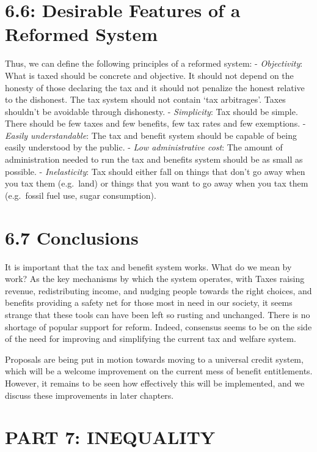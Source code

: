 \documentclass[]{tufte-handout}
\begin{document}
\hypertarget{desirable-features-of-a-reformed-system}{%
\section{6.6: Desirable Features of a Reformed
System}\label{desirable-features-of-a-reformed-system}}

Thus, we can define the following principles of a reformed system: -
\emph{Objectivity}: What is taxed should be concrete and objective. It
should not depend on the honesty of those declaring the tax and it
should not penalize the honest relative to the dishonest. The tax system
should not contain `tax arbitrages'. Taxes shouldn't be avoidable
through dishonesty. - \emph{Simplicity}: Tax should be simple. There
should be few taxes and few benefits, few tax rates and few exemptions.
- \emph{Easily understandable}: The tax and benefit system should be
capable of being easily understood by the public. - \emph{Low
administrative cost}: The amount of administration needed to run the tax
and benefits system should be as small as possible. -
\emph{Inelasticity}: Tax should either fall on things that don't go away
when you tax them (e.g.~land) or things that you want to go away when
you tax them (e.g.~fossil fuel use, sugar consumption).

\hypertarget{conclusions-1}{%
\section{6.7 Conclusions}\label{conclusions-1}}

It is important that the tax and benefit system works. What do we mean
by work? As the key mechanisms by which the system operates, with Taxes
raising revenue, redistributing income, and nudging people towards the
right choices, and benefits providing a safety net for those most in
need in our society, it seems strange that these tools can have been
left so rusting and unchanged. There is no shortage of popular support
for reform. Indeed, consensus seems to be on the side of the need for
improving and simplifying the current tax and welfare system.

Proposals are being put in motion towards moving to a universal credit
system, which will be a welcome improvement on the current mess of
benefit entitlements. However, it remains to be seen how effectively
this will be implemented, and we discuss these improvements in later
chapters.

\newpage

\hypertarget{part-7-inequality}{%
\section{PART 7: INEQUALITY}\label{part-7-inequality}}
\end{document}
